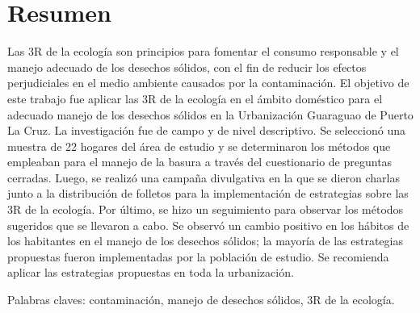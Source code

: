 {\setlength{\parskip}{-0.5cm}
\chapter*{Resumen}

Las 3R de la ecología son principios para fomentar el consumo responsable y el manejo adecuado de los desechos sólidos, con el fin de reducir los efectos perjudiciales en el medio ambiente causados por la contaminación. El objetivo de este trabajo fue aplicar las 3R de la ecología en el ámbito doméstico para el adecuado manejo de los desechos sólidos en la Urbanización Guaraguao de Puerto La Cruz. La investigación fue de campo y de nivel descriptivo. Se seleccionó una muestra de 22 hogares del área de estudio y se determinaron los métodos que empleaban para el manejo de la basura a través del cuestionario de preguntas cerradas. Luego, se realizó una campaña divulgativa en la que se dieron charlas junto a la distribución de folletos para la implementación de estrategias sobre las 3R de la ecología. Por último, se hizo un seguimiento para observar los métodos sugeridos que se llevaron a cabo. Se observó un cambio positivo en los hábitos de los habitantes en el manejo de los desechos sólidos; la mayoría de las estrategias propuestas fueron implementadas por la población de estudio. Se recomienda aplicar las estrategias propuestas en toda la urbanización.
}

Palabras claves: contaminación, manejo de desechos sólidos, 3R de la ecología.


\newpage